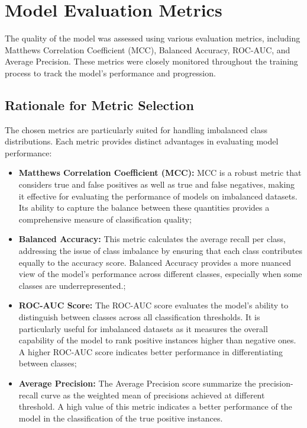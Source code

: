 \documentclass[10pt,twocolumn,letterpaper]{article}
\begin{document}
\section{Model Evaluation Metrics}

The quality of the model was assessed using various evaluation metrics, including Matthews Correlation Coefficient (MCC), Balanced Accuracy, ROC-AUC, and Average Precision. These metrics were closely monitored throughout the training process to track the model's performance and progression.

\subsection{Rationale for Metric Selection}

The chosen metrics are particularly suited for handling imbalanced class distributions. Each metric provides distinct advantages in evaluating model performance:

\begin{itemize}
    \item \textbf{Matthews Correlation Coefficient (MCC):} MCC is a robust metric that considers true and false positives as well as true and false negatives, making it effective for evaluating the performance of models on imbalanced datasets. 
    Its ability to capture the balance between these quantities provides a comprehensive measure of classification quality;
    \item \textbf{Balanced Accuracy:} This metric calculates the average recall per class, addressing the issue of class imbalance by ensuring that each class contributes equally to the accuracy score. 
    Balanced Accuracy provides a more nuanced view of the model's performance across different classes, especially when some classes are underrepresented.;
    \item \textbf{ROC-AUC Score:} The ROC-AUC score evaluates the model's ability to distinguish between classes across all classification thresholds. 
    It is particularly useful for imbalanced datasets as it measures the overall capability of the model to rank positive instances higher than negative ones. A higher ROC-AUC score indicates better performance in differentiating between classes;
    \item \textbf{Average Precision:} The Average Precision score summarize the precision-recall curve as the weighted mean of precisions achieved at different threshold. 
    A high value of this metric indicates a better performance of the model in the classification 
    of the true positive instances.

\end{itemize}
\end{document}
